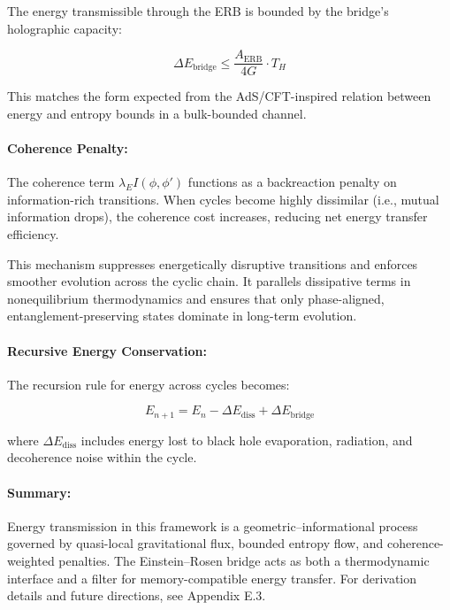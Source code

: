 The energy transmissible through the ERB is bounded by the bridge’s holographic capacity:

\begin{equation}
\Delta E_{\text{bridge}} \leq \frac{A_{\text{ERB}}}{4G} \cdot T_H
\end{equation}

This matches the form expected from the AdS/CFT-inspired relation between energy and entropy bounds in a bulk-bounded channel.

\paragraph{Coherence Penalty:}

The coherence term \( \lambda_E I(\phi, \phi') \) functions as a backreaction penalty on information-rich transitions. When cycles become highly dissimilar (i.e., mutual information drops), the coherence cost increases, reducing net energy transfer efficiency.

This mechanism suppresses energetically disruptive transitions and enforces smoother evolution across the cyclic chain. It parallels dissipative terms in nonequilibrium thermodynamics and ensures that only phase-aligned, entanglement-preserving states dominate in long-term evolution.

\paragraph{Recursive Energy Conservation:}

The recursion rule for energy across cycles becomes:

\begin{equation}
E_{n+1} = E_n - \Delta E_{\text{diss}} + \Delta E_{\text{bridge}}
\end{equation}

where \( \Delta E_{\text{diss}} \) includes energy lost to black hole evaporation, radiation, and decoherence noise within the cycle.

\paragraph{Summary:}

Energy transmission in this framework is a geometric–informational process governed by quasi-local gravitational flux, bounded entropy flow, and coherence-weighted penalties. The Einstein–Rosen bridge acts as both a thermodynamic interface and a filter for memory-compatible energy transfer. For derivation details and future directions, see Appendix E.3.

